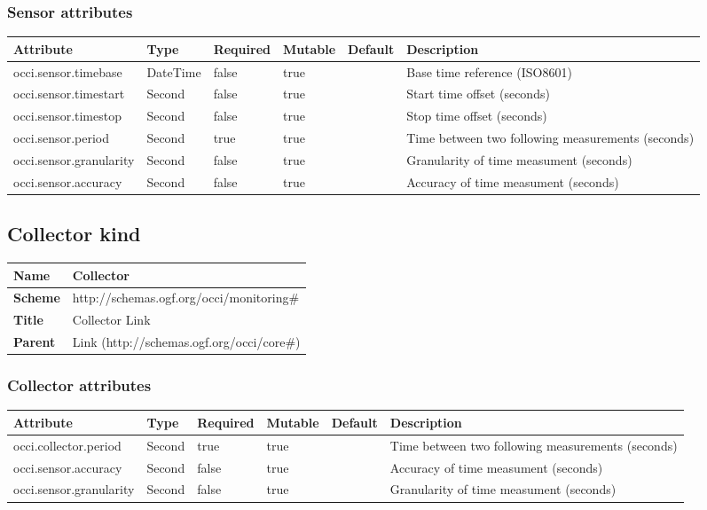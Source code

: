 \documentclass{article}
\begin{document}
\subsubsection{Sensor attributes}
\begin{tabularx}{\textwidth}{|l|l|p{1.4cm}|p{1.3cm}|l|X|}
  \hline
  \textbf{Attribute} & \textbf{Type} & \textbf{Required} & \textbf{Mutable} & \textbf{Default} & \textbf{Description} \\
  \hline  
  occi.sensor.timebase & DateTime & false & true &  & Base time reference (ISO8601) \\
  \hline
  occi.sensor.timestart & Second & false & true &  & Start time offset (seconds) \\
  \hline
  occi.sensor.timestop & Second & false & true &  & Stop time offset (seconds) \\
  \hline
  occi.sensor.period & Second & true & true &  & Time between two following measurements (seconds) \\
  \hline
  occi.sensor.granularity & Second & false & true &  & Granularity of time measument (seconds) \\
  \hline
  occi.sensor.accuracy & Second & false & true &  & Accuracy of time measument (seconds) \\
  \hline
\end{tabularx}


\subsection{Collector kind}
\begin{center}
\begin{tabular}{|l|l|}
  \hline
  \textbf{Name} & Collector \\
  \hline  
  \textbf{Scheme} & http://schemas.ogf.org/occi/monitoring\# \\
  \hline
  \textbf{Title} & Collector Link \\
  \hline
  \textbf{Parent} & Link (http://schemas.ogf.org/occi/core\#) \\
  \hline
\end{tabular}
\end{center}
\subsubsection{Collector attributes}
\begin{tabularx}{\textwidth}{|l|l|p{1.4cm}|p{1.3cm}|l|X|}
  \hline
  \textbf{Attribute} & \textbf{Type} & \textbf{Required} & \textbf{Mutable} & \textbf{Default} & \textbf{Description} \\
  \hline  
  occi.collector.period & Second & true & true &  & Time between two following measurements (seconds) \\
  \hline
  occi.sensor.accuracy & Second & false & true &  & Accuracy of time measument (seconds) \\
  \hline
  occi.sensor.granularity & Second & false & true &  & Granularity of time measument (seconds) \\
  \hline
\end{tabularx}
\end{document}
